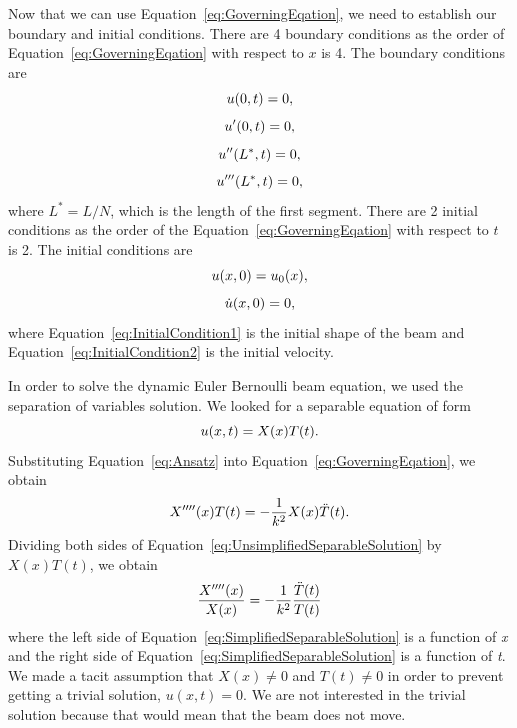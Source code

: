 \documentclass[12pt]{article}
\begin{document}
Now that we can use Equation~\eqref{eq:GoverningEqation}, we need to establish our boundary and initial conditions. There are 4 boundary conditions as the order of Equation~\eqref{eq:GoverningEqation} with respect to $x$ is 4. The boundary conditions are 
\begin{equation}\label{eq:BoundaryCondition1}
    \centering
    u(0,t) = 0,
\end{equation}
\begin{equation}\label{eq:BoundaryCondition2}
    \centering
    u'(0,t) = 0,
\end{equation}
\begin{equation}\label{eq:BoundaryCondition3}
    \centering
    u''(L^*,t) = 0,
\end{equation}
\begin{equation}\label{eq:BoundaryCondition4}
    \centering
    u'''(L^*,t) = 0,
\end{equation}
where $L^*=L/N$, which is the length of the first segment. There are 2 initial conditions as the order of the Equation~\eqref{eq:GoverningEqation} with respect to $t$ is 2. The initial conditions are
\begin{equation}\label{eq:InitialCondition1}
    \centering
    u(x,0) = u_0(x),
\end{equation}
\begin{equation}\label{eq:InitialCondition2}
    \centering
    \dot{u}(x,0) = 0,
\end{equation}
where Equation~\eqref{eq:InitialCondition1} is the initial shape of the beam and Equation~\eqref{eq:InitialCondition2} is the initial velocity.

In order to solve the dynamic Euler Bernoulli beam equation, we used the separation of variables solution. We looked for a separable equation of form
\begin{equation}\label{eq:Ansatz}
    \centering
    u(x,t) = X(x)T(t).
\end{equation}
Substituting Equation~\eqref{eq:Ansatz} into Equation~\eqref{eq:GoverningEqation}, we obtain
\begin{equation}\label{eq:UnsimplifiedSeparableSolution}
    \centering
    X''''(x)T(t) = -\frac{1}{k^2}X(x)\ddot{T}(t).
\end{equation}
Dividing both sides of Equation~\eqref{eq:UnsimplifiedSeparableSolution} by $X(x)T(t)$, we obtain
\begin{equation}\label{eq:SimplifiedSeparableSolution}
    \centering
    \frac{X''''(x)}{X(x)} = -\frac{1}{k^2}\frac{\ddot{T}(t)}{T(t)}
\end{equation}
where the left side of Equation~\eqref{eq:SimplifiedSeparableSolution} is a function of \emph{x} and the right side of Equation~\eqref{eq:SimplifiedSeparableSolution} is a function of \emph{t}. We made a tacit assumption that $X(x)\neq0$ and $T(t)\neq0$ in order to prevent getting a trivial solution, $u(x,t)=0$. We are not interested in the trivial solution because that would mean that the beam does not move.
\end{document}
